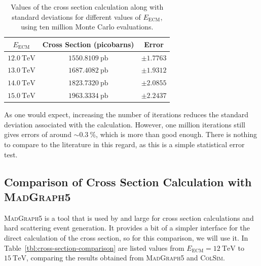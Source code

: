 \begin{table}[h]
  \centering
  
  \begin{tabular}{|c|c|c|}
    \hline
    $E_{\mathrm{ECM}}$ & Cross Section (picobarns) & Error \\ \hline
    $\qty{12.0}{\tera\electronvolt}$ & $\qty{1550.8109}{\pico\barn}$ & $\pm 1.7763$ \\ \hline
    $\qty{13.0}{\tera\electronvolt}$ & $\qty{1687.4082}{\pico\barn}$ & $\pm 1.9312$ \\ \hline
    $\qty{14.0}{\tera\electronvolt}$ & $\qty{1823.7320}{\pico\barn}$ & $\pm 2.0855$ \\ \hline
    $\qty{15.0}{\tera\electronvolt}$ & $\qty{1963.3334}{\pico\barn}$ & $\pm 2.2437$ \\ \hline
  \end{tabular}
  \caption{Values of the cross section calculation along with standard deviations for different values of $E_{\mathrm{ECM}}$, using ten million Monte Carlo evaluations.}
  \label{tbl:cross-section-error2}
\end{table}

As one would expect, increasing the number of iterations reduces the standard deviation associated with the calculation. However, one million iterations still gives errors of around $\sim\qty{0.3}{\percent}$, which is more than good enough. There is nothing to compare to the literature in this regard, as this is a simple statistical error test.

\subsection{Comparison of Cross Section Calculation with \texorpdfstring{\textsc{MadGraph5}}{MadGraph5}}

\textsc{MadGraph5} is a tool that is used by and large for cross section calculations and hard scattering event generation. It provides a bit of a simpler interface for the direct calculation of the cross section, so for this comparison, we will use it. In Table~\ref{tbl:cross-section-comparison} are listed values from $E_{\mathrm{ECM}} = \qty{12}{\tera\electronvolt}$ to $\qty{15}{\tera\electronvolt}$, comparing the results obtained from \textsc{MadGraph5} and \textsc{ColSim}.

